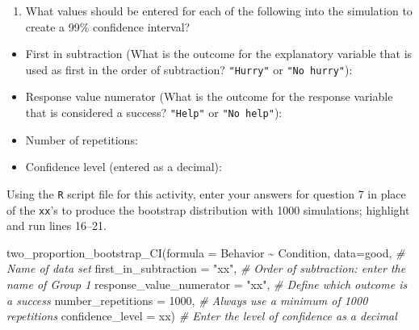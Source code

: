 \documentclass[
]{report}
\newenvironment{Shaded}{\begin{snugshade}}{\end{snugshade}}
\newcommand{\AttributeTok}[1]{\textcolor[rgb]{0.77,0.63,0.00}{#1}}
\newcommand{\CommentTok}[1]{\textcolor[rgb]{0.56,0.35,0.01}{\textit{#1}}}
\newcommand{\DecValTok}[1]{\textcolor[rgb]{0.00,0.00,0.81}{#1}}
\newcommand{\FunctionTok}[1]{\textcolor[rgb]{0.00,0.00,0.00}{#1}}
\newcommand{\NormalTok}[1]{#1}
\newcommand{\SpecialCharTok}[1]{\textcolor[rgb]{0.00,0.00,0.00}{#1}}
\newcommand{\StringTok}[1]{\textcolor[rgb]{0.31,0.60,0.02}{#1}}
\providecommand{\tightlist}{%
  \setlength{\itemsep}{0pt}\setlength{\parskip}{0pt}}
\begin{document}
\begin{enumerate}
\def\labelenumi{\arabic{enumi}.}
\setcounter{enumi}{6}
\tightlist
\item
  What values should be entered for each of the following into the simulation to create a 99\% confidence interval?
  \vspace{.5mm}
\end{enumerate}

\begin{itemize}
\tightlist
\item
  First in subtraction (What is the outcome for the explanatory variable that is used as first in the order of subtraction? \texttt{"Hurry"} or \texttt{"No\ hurry"}):
\end{itemize}

\vspace{.15in}

\begin{itemize}
\tightlist
\item
  Response value numerator (What is the outcome for the response variable that is considered a success? \texttt{"Help"} or \texttt{"No\ help"}):
\end{itemize}

\vspace{.15in}

\begin{itemize}
\tightlist
\item
  Number of repetitions:
\end{itemize}

\vspace{.15in}

\begin{itemize}
\tightlist
\item
  Confidence level (entered as a decimal):
\end{itemize}

\vspace{.15in}

Using the \texttt{R} script file for this activity, enter your answers for question 7 in place of the \texttt{xx}'s to produce the bootstrap distribution with 1000 simulations; highlight and run lines 16--21.

\begin{Shaded}
\begin{Highlighting}[]
\FunctionTok{two\_proportion\_bootstrap\_CI}\NormalTok{(}\AttributeTok{formula =}\NormalTok{ Behavior }\SpecialCharTok{\textasciitilde{}}\NormalTok{ Condition, }
        \AttributeTok{data=}\NormalTok{good, }\CommentTok{\# Name of data set}
        \AttributeTok{first\_in\_subtraction =} \StringTok{"xx"}\NormalTok{, }\CommentTok{\# Order of subtraction: enter the name of Group 1}
        \AttributeTok{response\_value\_numerator =} \StringTok{"xx"}\NormalTok{, }\CommentTok{\# Define which outcome is a success }
        \AttributeTok{number\_repetitions =} \DecValTok{1000}\NormalTok{, }\CommentTok{\# Always use a minimum of 1000 repetitions}
        \AttributeTok{confidence\_level =}\NormalTok{ xx) }\CommentTok{\# Enter the level of confidence as a decimal}
\end{Highlighting}
\end{Shaded}
\end{document}
